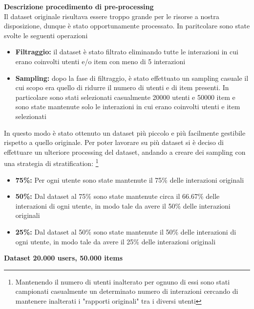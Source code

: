 \noindent\textbf{Descrizione procedimento di pre-processing}\\


\noindent Il dataset originale risultava essere troppo grande per le risorse a nostra disposizione, dunque è stato opportunamente processato. In paritcolare sono state svolte le seguenti operazioni
\begin{itemize}
    \item \textbf{Filtraggio:} il dataset è stato filtrato eliminando tutte le interazioni in cui erano coinvolti utenti e/o item con meno di 5 interazioni
    \item \textbf{Sampling:} dopo la fase di filtraggio, è stato effettuato un sampling casuale il cui scopo era quello di ridurre il numero di utenti e di item presenti. In particolare sono stati selezionati casualmente 20000 utenti e 50000 item e sono state mantenute solo le interazioni in cui erano coinvolti utenti e item selezionati
\end{itemize}

\noindent In questo modo è stato ottenuto un dataset più piccolo e più facilmente gestibile rispetto a quello originale.
Per poter lavorare su più dataset si è deciso di effettuare un ulteriore processing del dataset, andando a creare dei sampling con una strategia di stratification: \footnote{{{Mantenendo il numero di utenti inalterato per ognuno di essi sono stati campionati casualmente un determinato numero di interazioni cercando di mantenere inalterati i "rapporti originali" tra i diversi utenti}}}{}
\begin{itemize}
    \item \textbf{75\%:} Per ogni utente sono state mantenute il 75\% delle interazioni originali
    \item \textbf{50\%:} Dal dataset al 75\% sono state mantenute circa il 66.67\% delle interazioni di ogni utente, in modo tale da avere il 50\% delle interazioni originali
    \item \textbf{25\%:} Dal dataset al 50\% sono state mantenute il 50\% delle interazioni di ogni utente, in modo tale da avere il 25\% delle interazioni originali
\end{itemize}


\noindent\textbf{Dataset 20.000 users, 50.000 items}


